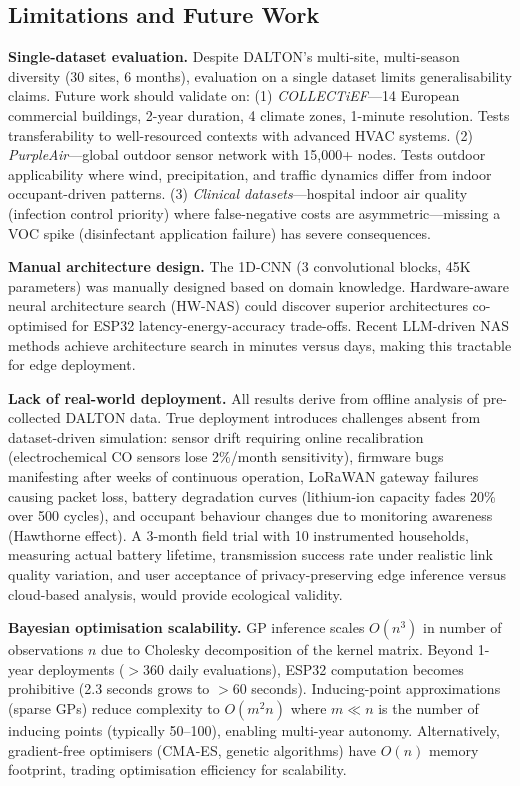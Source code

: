 \subsection{Limitations and Future Work}

\textbf{Single-dataset evaluation.} Despite DALTON's multi-site, multi-season diversity (30 sites, 6 months), evaluation on a single dataset limits generalisability claims. Future work should validate on: (1) \emph{COLLECTiEF}---14 European commercial buildings, 2-year duration, 4 climate zones, 1-minute resolution. Tests transferability to well-resourced contexts with advanced HVAC systems. (2) \emph{PurpleAir}---global outdoor sensor network with 15,000+ nodes. Tests outdoor applicability where wind, precipitation, and traffic dynamics differ from indoor occupant-driven patterns. (3) \emph{Clinical datasets}---hospital indoor air quality (infection control priority) where false-negative costs are asymmetric---missing a VOC spike (disinfectant application failure) has severe consequences.

\textbf{Manual architecture design.} The 1D-CNN (3 convolutional blocks, 45K parameters) was manually designed based on domain knowledge. Hardware-aware neural architecture search (HW-NAS) could discover superior architectures co-optimised for ESP32 latency-energy-accuracy trade-offs. Recent LLM-driven NAS methods achieve architecture search in minutes versus days, making this tractable for edge deployment.

\textbf{Lack of real-world deployment.} All results derive from offline analysis of pre-collected DALTON data. True deployment introduces challenges absent from dataset-driven simulation: sensor drift requiring online recalibration (electrochemical CO sensors lose 2\%/month sensitivity), firmware bugs manifesting after weeks of continuous operation, LoRaWAN gateway failures causing packet loss, battery degradation curves (lithium-ion capacity fades 20\% over 500 cycles), and occupant behaviour changes due to monitoring awareness (Hawthorne effect). A 3-month field trial with 10 instrumented households, measuring actual battery lifetime, transmission success rate under realistic link quality variation, and user acceptance of privacy-preserving edge inference versus cloud-based analysis, would provide ecological validity.

\textbf{Bayesian optimisation scalability.} GP inference scales $O(n^3)$ in number of observations $n$ due to Cholesky decomposition of the kernel matrix. Beyond 1-year deployments ($>$360 daily evaluations), ESP32 computation becomes prohibitive (2.3 seconds grows to $>$60 seconds). Inducing-point approximations (sparse GPs) reduce complexity to $O(m^2 n)$ where $m \ll n$ is the number of inducing points (typically 50--100), enabling multi-year autonomy. Alternatively, gradient-free optimisers (CMA-ES, genetic algorithms) have $O(n)$ memory footprint, trading optimisation efficiency for scalability.

